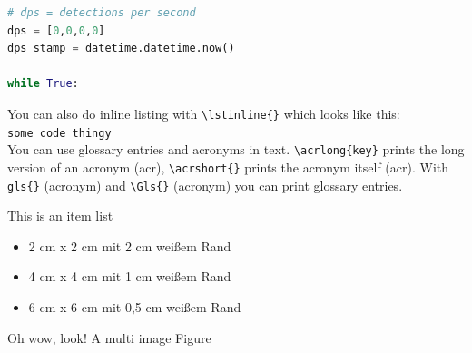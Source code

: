 \documentclass[../Main/main.tex]{subfiles}
\begin{document}
\begin{lstlisting}[language=Python,caption=DPS variable Instantiations,firstnumber=58]
# dps = detections per second
dps = [0,0,0,0]
dps_stamp = datetime.datetime.now()

while True:\end{lstlisting}

You can also do inline listing with \verb!\lstinline{}! which looks like this:\\
\lstinline{some code thingy}\\

You can use glossary entries and acronyms in text. \verb!\acrlong{key}! prints the long
version of an acronym (\acrlong{acr}), \verb!\acrshort{}! prints the acronym itself (\acrshort{acr}).
With \verb!gls{}! (\gls{acronym}) and \verb!\Gls{}! (\Gls{acronym}) you can print glossary entries.

This is an item list

\begin{itemize}
    \item 2 cm x 2 cm mit 2 cm weißem Rand
    \item 4 cm x 4 cm mit 1 cm weißem Rand
    \item 6 cm x 6 cm mit 0,5 cm weißem Rand
\end{itemize}

Oh wow, look! A multi image Figure

\begin{figure}[H]
    \centering
\end{figure}
\end{document}

